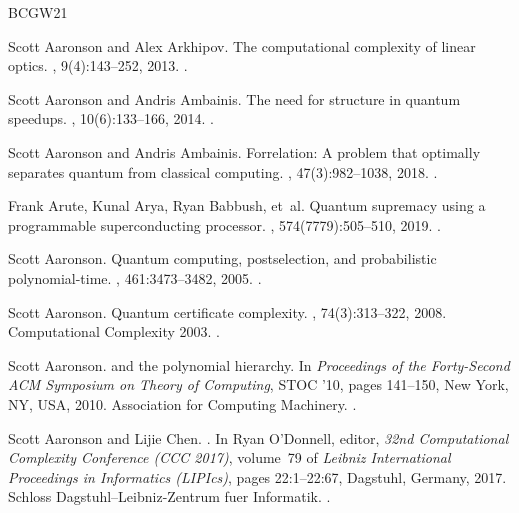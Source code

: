 \documentclass[10pt,a4paper]{article}
\begin{document}
\newcommand{\etalchar}[1]{$^{#1}$}
\begin{thebibliography}{BCGW21}

Scott Aaronson and Alex Arkhipov.
\newblock The computational complexity of linear optics.
, 9(4):143--252, 2013.
\newblock \href {https://doi.org/10.4086/toc.2013.v009a004}
  {}.

Scott Aaronson and Andris Ambainis.
\newblock The need for structure in quantum speedups.
, 10(6):133--166, 2014.
\newblock \href {https://doi.org/10.4086/toc.2014.v010a006}
  {}.

Scott Aaronson and Andris Ambainis.
\newblock Forrelation: A problem that optimally separates quantum from
  classical computing.
, 47(3):982--1038, 2018.
\newblock \href {https://doi.org/10.1137/15M1050902}
  {}.

\bibitem[AAB{\etalchar{+}}19]{AAB+19}
Frank Arute, Kunal Arya, Ryan Babbush, et~al.
\newblock Quantum supremacy using a programmable superconducting processor.
, 574(7779):505--510, 2019.
\newblock \href {https://doi.org/10.1038/s41586-019-1666-5}
  {}.

Scott Aaronson.
\newblock Quantum computing, postselection, and probabilistic polynomial-time.
, 461:3473--3482, 2005.
\newblock \href {https://doi.org/10.1098/rspa.2005.1546}
  {}.

Scott Aaronson.
\newblock Quantum certificate complexity.
, 74(3):313--322, 2008.
\newblock Computational Complexity 2003.
\newblock \href {https://doi.org/10.1016/j.jcss.2007.06.020}
  {}.

Scott Aaronson.
 and the polynomial hierarchy.
\newblock In {\em Proceedings of the Forty-Second ACM Symposium on Theory of
  Computing}, STOC '10, pages 141--150, New York, NY, USA, 2010. Association
  for Computing Machinery.
\newblock \href {https://doi.org/10.1145/1806689.1806711}
  {}.

Scott Aaronson and Lijie Chen.
.
\newblock In Ryan O'Donnell, editor, {\em 32nd Computational Complexity
  Conference (CCC 2017)}, volume~79 of {\em Leibniz International Proceedings
  in Informatics (LIPIcs)}, pages 22:1--22:67, Dagstuhl, Germany, 2017. Schloss
  Dagstuhl--Leibniz-Zentrum fuer Informatik.
\newblock \href {https://doi.org/10.4230/LIPIcs.CCC.2017.22}
  {}.


\end{thebibliography}
\end{document}
